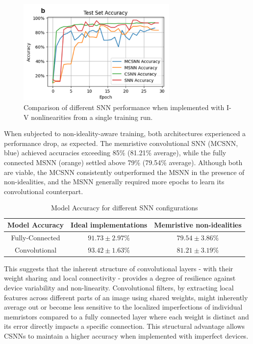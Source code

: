 \begin{figure}[htbp!] 
    \centering    
    \includegraphics[width=0.7\textwidth]{Chapter6/Figs/k.png}
    \caption[Comparison of different SNN performance when implemented with I-V nonlinearities from a single training run.]{Comparison of different SNN performance when implemented with I-V nonlinearities from a single training run.}
    \label{fig:6k}
\end{figure}

\noindent When subjected to non-ideality-aware training, both architectures experienced a performance drop, as expected. The memristive convolutional SNN (MCSNN, blue) achieved accuracies exceeding 85\% (81.21\% average), while the fully connected MSNN (orange) settled above 79\% (79.54\% average). Although both are viable, the MCSNN consistently outperformed the MSNN in the presence of non-idealities, and the MSNN generally required more epochs to learn its convolutional counterpart.\\

\begin{table}[!t]
    \caption{Model Accuracy for different SNN configurations}
    \begin{center}
    \begin{tabular}{|c|c|c|}
    \hline
    Model Accuracy  & Ideal implementations & Memristive non-idealities \\ \hline
    Fully-Connected & $91.73 \pm 2.97 \%$  & $79.54 \pm 3.86 \%$ \\ \hline
    Convolutional   & $93.42 \pm 1.63 \%$  & $81.21 \pm 3.19 \%$  \\ \hline
    \end{tabular}
    \label{table:6a}
    \end{center}
    \vspace*{-\baselineskip}
\end{table}

\noindent This suggests that the inherent structure of convolutional layers - with their weight sharing and local connectivity - provides a degree of resilience against device variability and non-linearity. Convolutional filters, by extracting local features across different parts of an image using shared weights, might inherently average out or become less sensitive to the localized imperfections of individual memristors compared to a fully connected layer where each weight is distinct and its error directly impacts a specific connection. This structural advantage allows CSNNs to maintain a higher accuracy when implemented with imperfect devices.\\

